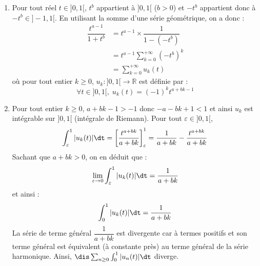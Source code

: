 \documentclass[a4paper,10pt]{report}
\begin{document}
\begin{enumerate}
\item Pour tout réel $t \in ]0,1[$, $t^b$ appartient à $]0,1[$ ($b>0$) et $-t^b$ appartient donc à $-t^b \in ]-1,1[$. En utilisant la somme d'une série géométrique, on a donc :
\begin{align*}
\dfrac{t^{a-1}}{1+t^b} & = t^{a-1} \times \dfrac{1}{1-(-t^b)} \\
& = t^{a-1} \sum_{k=0}^{+ \infty} (-t^b)^k \\
& = \sum_{k=0}^{+ \infty} u_k(t)
\end{align*}
où pour tout entier $k \geq 0$, $u_k : ]0,1[ \rightarrow \mathbb{R}$ est définie par :
$$ \forall t \in ]0,1[, \; u_k(t) = (-1)^k t^{a+bk-1}$$
\item Pour tout entier $k \geq 0$, $a+bk-1>-1$ donc $-a-bk+1<1$ et ainsi $u_k$ est intégrable sur $]0,1[$ (intégrale de Riemann). Pour tout $\varepsilon \in ]0,1[$,
$$ \int_{\varepsilon}^1 \vert u_k(t) \vert \dt = \left[ \dfrac{t^{a+bk}}{a+bk} \right]_{\varepsilon}^1 =\dfrac{1}{a+bk} - \dfrac{t^{a+bk}}{a+bk}$$
Sachant que $a+bk>0$, on en déduit que :
$$ \lim_{\varepsilon \rightarrow 0}  \int_{\varepsilon}^1 \vert u_k(t) \vert \dt  = \dfrac{1}{a+bk}$$
et ainsi :
$$ \int_0^1 \vert u_k(t) \vert \dt = \dfrac{1}{a+bk}$$
La série de terme général $ \dfrac{1}{a+bk}$ est divergente car à termes positifs et son terme général est équivalent (à constante près) au terme général de la série harmonique. Ainsi, $\dis \sum_{n \geq 0} \int_0^1 \vert u_n(t) \vert \dt$ diverge.

\medskip


\end{enumerate}
\end{document}
